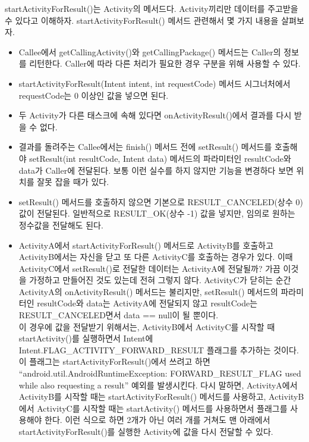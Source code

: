 startActivityForResult()는 Activity의 메서드다. Activity끼리만 데이터를 주고받을 수 있다고 이해하자. 
startActivityForResult() 메서드 관련해서 몇 가지 내용을 살펴보자.
\begin{itemize} 
\item Callee에서 getCallingActivity()와 getCallingPackage() 메서드는 Caller의 정보를 리턴한다. Caller에 따라 다른 처리가 필요한 경우 구분을 위해 사용할 수 있다. 

\item startActivityForResult(Intent intent, int requestCode) 메서드 시그너처에서 requestCode는 0 이상인 값을 넣으면 된다.

\item 두 Activity가 다른 태스크에 속해 있다면 onActivityResult()에서 결과를 다시 받을 수 없다.

\item 결과를 돌려주는 Callee에서는 finish() 메서드 전에 setResult() 메서드를 호출해야 setResult(int resultCode, Intent data) 메서드의 파라미터인 resultCode와 data가 Caller에 전달된다. 보통 이런 실수를 하지 않지만 기능을 변경하다 보면 위치를 잘못 잡을 때가 있다.
\item setResult() 메서드를 호출하지 않으면 기본으로 RESULT\_CANCELED(상수 0) 값이 전달된다. 일반적으로 RESULT\_OK(상수 -1) 값을 넣지만, 임의로 원하는 정수값을 전달해도 된다.
\item ActivityA에서 startActivityForResult() 메서드로 ActivityB를 호출하고 ActivityB에서는 자신을 닫고 또 다른 ActivityC를 호출하는 경우가 있다. 
이때 ActivityC에서 setResult()로 전달한 데이터는 ActivityA에 전달될까? 가끔 이것을 가정하고 만들어진 것도 있는데 전혀 그렇지 않다. 
ActivityC가 닫히는 순간 ActivityA의 onActivityResult() 메서드는 불리지만, setResult() 메서드의 파라미터인 resultCode와 data는 ActivityA에 전달되지 않고 resultCode는 RESULT\_CANCELED면서 data == null이 될 뿐이다.\\

이 경우에 값을 전달받기 위해서는, ActivityB에서 ActivityC를 시작할 때 startActivity()를 실행하면서 Intent에 Intent.FLAG\_ACTIVITY\_FORWARD\_RESULT 플래그를 추가하는 것이다.
이 플래그는 startActivityForResult()에서 쓰려고 하면 ``android.util.AndroidRuntimeExce\-ption: FORWARD\_RESULT\_F\-LAG used while also requesting a result''  예외를 발생시킨다. 
다시 말하면, ActivityA에서 ActivityB를 시작할 때는 startActivityForResult() 메서드를 사용하고, ActivityB에서 ActivityC를 시작할 때는 startActivity() 메서드를 사용하면서 플래그를 사용해야 한다. 
이런 식으로 하면 2개가 아닌 여러 개를 거쳐도 맨 아래에서 startActivityForResult()를 실행한 Activity에 값을 다시 전달할 수 있다.
\end{itemize}

